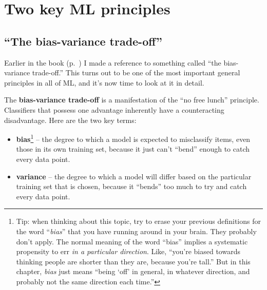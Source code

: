 \chapter{Two key ML principles}

\section{``The bias-variance trade-off''}

Earlier in the book (p.~\pageref{bvTradeoffLowess}) I made a reference to
something called ``the bias-variance trade-off.'' This turns out to be one of
the most important general principles in all of ML, and it's now time to look
at it in detail.


The \textbf{bias-variance trade-off} is a manifestation of the ``no free
lunch'' principle. Classifiers that possess one advantage inherently have a
counteracting disadvantage. Here are the two key terms:

\vspace{-.1in}
\begin{itemize}
\itemsep.1em

\item \textbf{bias}\footnote{Tip: when thinking about this topic, try to erase
your previous definitions for the word ``\textit{bias}'' that you have running
around in your brain. They probably don't apply. The normal meaning of the word
``bias'' implies a systematic propensity to err \textit{in a particular
direction}. Like, ``you're biased towards thinking people are shorter than they
are, because you're tall.'' But in this chapter, \textit{bias} just means
``being `off' in general, in whatever direction, and probably not the same
direction each time.''} -- the degree to which a model is expected to
misclassify items, even those in its own training set, because it just can't
``bend'' enough to catch every data point.

\item \textbf{variance} -- the degree to which a model will differ based on the
particular training set that is chosen, because it ``bends'' too much to try
and catch every data point.

\end{itemize}
\vspace{.2in}
\pagebreak



